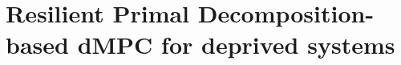 \documentclass[aspectratio=169]{beamer}
\begin{document}
\section{Resilient Primal Decomposition-based dMPC for deprived systems}



\end{document}
